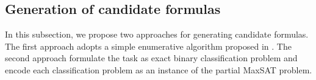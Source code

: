\documentclass[review]{elsarticle}
\begin{document}
%
%

	\subsection{Generation of candidate formulas} \label{sec:GenCandForm}
	In this subsection, we propose two approaches for generating candidate formulas.
	The first approach adopts a simple enumerative algorithm proposed in \cite{UduRDMMA2013}. The second approach formulate the task as exact binary
	classification problem and encode each classification problem as an instance of the partial
	MaxSAT problem.
	
\end{document}
